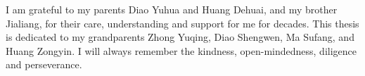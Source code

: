 \documentclass[
11pt, %
ngerman,
english, %
singlespacing, %
headsepline, %
]{MastersDoctoralThesis} %
\begin{document}
\begin{acknowledgements}
%
I am grateful to my parents Diao Yuhua and Huang Dehuai, and my brother Jialiang, for their care, 
understanding and support for me for decades. 
This thesis is dedicated to my grandparents Zhong Yuqing, Diao Shengwen, Ma Sufang, and Huang Zongyin. 
I will always remember the kindness, open-mindedness, diligence and perseverance.
\end{acknowledgements}

{
\hypersetup{linkcolor=black}
\tableofcontents %
}

{
\hypersetup{linkcolor=black}
\listoffigures %
}

{
\hypersetup{linkcolor=black}
\listoftables %
}

\end{document}
